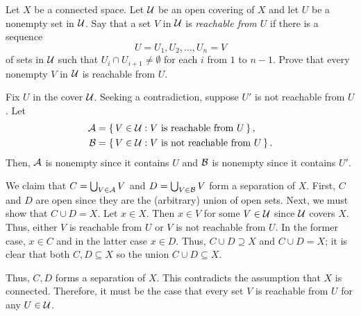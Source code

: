 \begin{problem}
  Let \(X\) be a connected space. Let \(\mathcal{U}\) be an open covering of
  \(X\) and let \(U\) be a nonempty set in \(\mathcal{U}\). Say that a set \(V\)
  in \(\mathcal{U}\) is \emph{reachable from \(U\)} if there is a sequence
  \[
    U=U_1,U_2,\dotsc,U_n=V
  \]
  of sets in \(\mathcal{U}\) such that \(U_i\cap U_{i+1}\neq\emptyset\) for each
  \(i\) from \(1\) to \(n-1\). Prove that every nonempty \(V\) in \(\mathcal{U}\)
  is reachable from \(U\).
\end{problem}
\begin{solution}
  Fix \(U\) in the cover \(\mathcal{U}\). Seeking a contradiction, suppose \(U'\)
  is not reachable from \(U\). Let
  \begin{align*}
    \mathcal{A}&=\left\{\,V\in\mathcal{U}:\text{\(V\) is reachable from
           \(U\)}\,\right\},\\
    \mathcal{B}&=\left\{\,V\in\mathcal{U}:\text{\(V\) is not reachable from
    \(U\)}\,\right\}.
  \end{align*}
  Then, \(\mathcal{A}\) is nonempty since it contains \(U\) and \(\mathcal{B}\) is
  nonempty since it contains \(U'\).

  We claim that \(C=\bigcup_{V\in\mathcal{A}}V\) and \(D=\bigcup_{V\in\mathcal{B}}V\)
  form a separation of \(X\). First, \(C\) and \(D\) are open since they
  are the (arbitrary) union of open sets. Next, we must show that
  \(C\cup D=X\). Let \(x\in X\). Then \(x\in V\) for some \(V\in\mathcal{U}\)
  since \(\mathcal{U}\) covers \(X\). Thus, either \(V\) is reachable from \(U\)
  or \(V\) is not reachable from \(U\). In the former case, \(x\in C\) and
  in the latter case \(x\in D\). Thus, \(C\cup D\supseteq X\) and
  \(C\cup D=X\); it is clear that both \(C,D\subseteq X\) so the union
  \(C\cup D\subseteq X\).

  Thus, \(C,D\) forms a separation of \(X\). This contradicts the
  assumption that \(X\) is connected. Therefore, it must be the case that
  every set \(V\) is reachable from \(U\) for any \(U\in\mathcal{U}\).
\end{solution}

